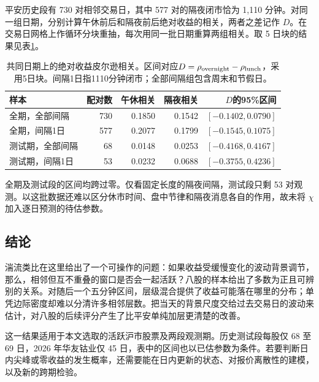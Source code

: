 \documentclass[11pt,a4paper]{article}
\begin{document}
平安历史段有 730 对相邻交易日，其中 577 对的隔夜闭市恰为 1,110 分钟。对同一组日期，分别计算午休前后和隔夜前后绝对收益的相关，两者之差记作 $D$。在交易日网格上作循环分块重抽，每次用同一批日期重算两组相关。取 5 日块的结果见表\ref{tab:market_clock_boot}。
\begin{table}[H]\centering\small
\caption{共同日期上的绝对收益皮尔逊相关。区间对应$D=\rho_{\rm overnight}-\rho_{\rm lunch}$，采用5日块。间隔1日指1110分钟闭市；全部间隔组包含周末和节假日。}\label{tab:market_clock_boot}
\begin{tabular}{lrrrr}\toprule
样本 & 配对数 & 午休相关 & 隔夜相关 & $D$的95\%区间\\\midrule
全期，全部间隔 & 730 & 0.1850 & 0.1542 & $[-0.1402,0.0790]$\\
全期，间隔1日 & 577 & 0.2077 & 0.1799 & $[-0.1545,0.1075]$\\
测试期，全部间隔 & 68 & 0.0148 & 0.0253 & $[-0.4168,0.4167]$\\
测试期，间隔1日 & 53 & 0.0232 & 0.0688 & $[-0.3755,0.4236]$\\
\bottomrule\end{tabular}

\end{table}
全期及测试段的区间均跨过零。仅看固定长度的隔夜间隔，测试段只剩 53 对观测。以这批数据还难以区分休市时间、盘中节律和隔夜消息各自的作用，故未将 $\chi$ 加入逐日预测的待估参数。

\subsection{结论}
湍流类比在这里给出了一个可操作的问题：如果收益受缓慢变化的波动背景调节，那么，相邻但互不重叠的窗口是否会一起活跃？八股的样本给出了多数为正且可辨别的关系。对随后一个五分钟区间，层级混合提供了收益可能落在哪里的分布；单凭边际密度却难以分清许多相邻层数。把当天的背景尺度交给过去交易日的波动来估计，对八股的后续评分产生了比平安单纯加层更清楚的改善。

这一结果适用于本文选取的活跃沪市股票及两段观测期。历史测试段每股仅 68 至 69 日，2026 年华友钴业仅 45 日，表中的区间也以已估参数为条件。若要判断日内尖峰或零收益的发生概率，还需要能在日内更新的状态、对报价离散性的建模，以及新的跨期检验。
\end{document}
